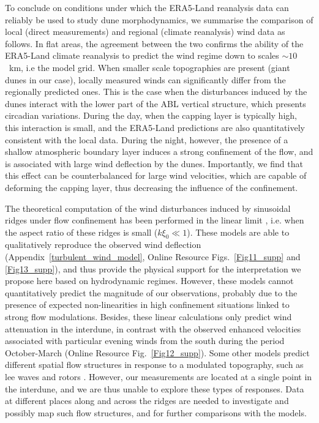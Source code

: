 To conclude on conditions under which the ERA5-Land reanalysis data can reliably be used to study dune morphodynamics, we summarise the comparison of local (direct measurements) and regional (climate reanalysis) wind data as follows. In flat areas, the agreement between the two confirms the ability of the ERA5-Land climate reanalysis to predict the wind regime down to scales $\sim10$~km, i.e the model grid. When smaller scale topographies are present (giant dunes in our case), locally measured winds can significantly differ from the regionally predicted ones. This is the case when the disturbances induced by the dunes interact with the lower part of the ABL vertical structure, which presents circadian variations. During the day, when the capping layer is typically high, this interaction is small, and the ERA5-Land predictions are also quantitatively consistent with the local data. During the night, however, the presence of a shallow atmospheric boundary layer induces a strong confinement of the flow, and is associated with large wind deflection by the dunes. Importantly, we find that this effect can be counterbalanced for large wind velocities, which are capable of deforming the capping layer, thus decreasing the influence of the confinement.

The theoretical computation of the wind disturbances induced by sinusoidal ridges under flow confinement has been performed in the linear limit \citep{Andreotti2009, Andreotti2012}, i.e. when the aspect ratio of these ridges is small ($k\xi_0 \ll 1$). These models are able to qualitatively reproduce the observed wind deflection (Appendix~\ref{turbulent_wind_model}, Online Resource Figs.~\ref{Fig11_supp} and \ref{Fig13_supp}), and thus provide the physical support for the interpretation we propose here based on hydrodynamic regimes. However, these models cannot quantitatively predict the magnitude of our observations, probably due to the presence of expected non-linearities in high confinement situations linked to strong flow modulations. Besides, these linear calculations only predict wind attenuation in the interdune, in contrast with the observed enhanced velocities associated with particular evening winds from the south during the period October-March (Online Resource Fig.~\ref{Fig12_supp}). Some other models predict different spatial flow structures in response to a modulated topography, such as lee waves and rotors \citep{baines1995, Vosper2004}. However, our measurements are located at a single point in the interdune, and we are thus unable to explore these types of responses. Data at different places along and across the ridges are needed to investigate and possibly map such flow structures, and for further comparisons with the models.


